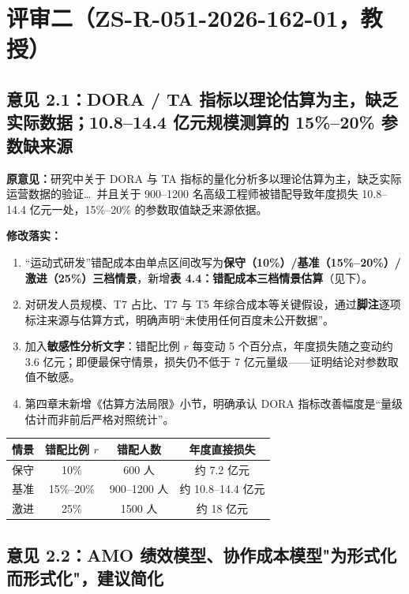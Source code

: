 \documentclass[11pt,a4paper]{ctexart}
\begin{document}
\section{评审二（ZS-R-051-2026-162-01，教授）}

\subsection{意见 2.1：DORA / TA 指标以理论估算为主，缺乏实际数据；10.8--14.4 亿元规模测算的 15\%--20\% 参数缺来源}

\noindent\textbf{原意见：}研究中关于 DORA 与 TA 指标的量化分析多以理论估算为主，缺乏实际运营数据的验证\ldots\ 并且关于 900--1200 名高级工程师被错配导致年度损失 10.8--14.4 亿元一处，15\%--20\% 的参数取值缺乏来源依据。

\noindent\textbf{修改落实：}
\begin{enumerate}[leftmargin=2em,itemsep=0.3em]
  \item “运动式研发”错配成本由单点区间改写为\textbf{保守（10\%）/基准（15\%--20\%）/激进（25\%）三档情景}，新增\textbf{表 4.4：错配成本三档情景估算}（见下）。
  \item 对研发人员规模、T7 占比、T7 与 T5 年综合成本等关键假设，通过\textbf{脚注}逐项标注来源与估算方式，明确声明“未使用任何百度未公开数据”。
  \item 加入\textbf{敏感性分析文字}：错配比例 $r$ 每变动 5 个百分点，年度损失随之变动约 3.6 亿元；即便最保守情景，损失仍不低于 7 亿元量级——证明结论对参数取值不敏感。
  \item 第四章末新增《估算方法局限》小节，明确承认 DORA 指标改善幅度是“量级估计而非前后严格对照统计”。
\end{enumerate}

\vspace{0.3em}
\begin{center}
\fontsize{9}{11}\selectfont
\begin{tabular}{lccc}
\toprule
\textbf{情景} & \textbf{错配比例 $r$} & \textbf{错配人数} & \textbf{年度直接损失} \\
\midrule
保守 & 10\%       & 600 人        & 约 7.2 亿元 \\
基准 & 15\%--20\% & 900--1200 人  & 约 10.8--14.4 亿元 \\
激进 & 25\%       & 1500 人       & 约 18 亿元 \\
\bottomrule
\end{tabular}
\end{center}

\subsection{意见 2.2：AMO 绩效模型、协作成本模型"为形式化而形式化"，建议简化}
\end{document}
